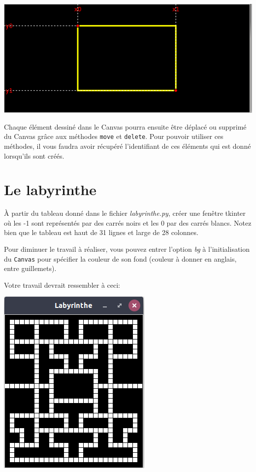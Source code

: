 \documentclass{article}
\begin{document}
\includegraphics[width=.9\linewidth]{./img/coord_canvas.png}

\noindent
Chaque élément dessiné dans le Canvas pourra ensuite être déplacé ou supprimé du Canvas grâce aux méthodes \verb~move~ et \verb~delete~.
Pour pouvoir utiliser ces méthodes, il vous faudra avoir récupéré l'identifiant de ces éléments qui est donné lorsqu'ils sont créés.

\section{Le labyrinthe}
\label{sec-4}

À partir du tableau donné dans le fichier \emph{labyrinthe.py}, créer une fenêtre tkinter où les -1 sont représentés par des carrés noirs et les 0 par des carrés blancs.
Notez bien que le tableau est haut de 31 lignes et large de 28 colonnes.

\noindent
Pour diminuer le travail à réaliser, vous pouvez entrer l'option \emph{bg} à l'initialisation du \verb~Canvas~ pour spécifier la couleur de son fond (couleur à donner en anglais, entre guillemets).

\noindent
Votre travail devrait ressembler à ceci:

\includegraphics[width=.9\linewidth]{./img/labyrinthe.png}
\end{document}
